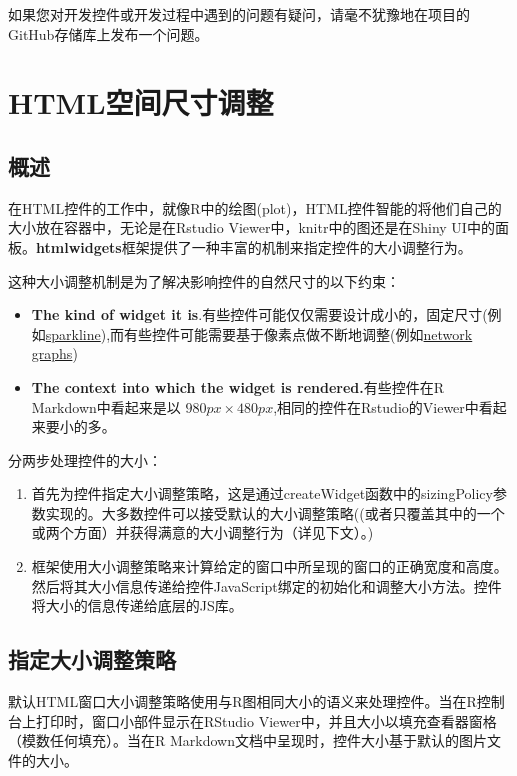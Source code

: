 \documentclass[]{book}
\theoremstyle{definition}
\theoremstyle{definition}
\theoremstyle{definition}
\theoremstyle{remark}
\begin{document}
如果您对开发控件或开发过程中遇到的问题有疑问，请毫不犹豫地在项目的GitHub存储库上发布一个问题。

\chapter{HTML空间尺寸调整}\label{htmlwidgets-Sizing}

\section{概述}

在HTML控件的工作中，就像R中的绘图(plot)，HTML控件智能的将他们自己的大小放在容器中，无论是在Rstudio
Viewer中，knitr中的图还是在Shiny
UI中的面板。\textbf{htmlwidgets}框架提供了一种丰富的机制来指定控件的大小调整行为。

这种大小调整机制是为了解决影响控件的自然尺寸的以下约束：

\begin{itemize}
\item
  \textbf{The kind of widget it
  is}.有些控件可能仅仅需要设计成小的，固定尺寸(例如\href{https://github.com/htmlwidgets/sparkline}{sparkline}),而有些控件可能需要基于像素点做不断地调整(例如\href{http://christophergandrud.github.io/networkD3/}{network
  graphs})
\item
  \textbf{The context into which the widget is rendered.}有些控件在R
  Markdown中看起来是以
  \(980px \times 480px\),相同的控件在Rstudio的Viewer中看起来要小的多。
\end{itemize}

分两步处理控件的大小：

\begin{enumerate}
\def\labelenumi{\arabic{enumi}.}
\item
  首先为控件指定大小调整策略，这是通过createWidget函数中的sizingPolicy参数实现的。大多数控件可以接受默认的大小调整策略((或者只覆盖其中的一个或两个方面）并获得满意的大小调整行为（详见下文）。)
\item
  框架使用大小调整策略来计算给定的窗口中所呈现的窗口的正确宽度和高度。然后将其大小信息传递给控件JavaScript绑定的初始化和调整大小方法。控件将大小的信息传递给底层的JS库。
\end{enumerate}

\section{指定大小调整策略}

默认HTML窗口大小调整策略使用与R图相同大小的语义来处理控件。当在R控制台上打印时，窗口小部件显示在RStudio
Viewer中，并且大小以填充查看器窗格（模数任何填充）。当在R
Markdown文档中呈现时，控件大小基于默认的图片文件的大小。
\end{document}
